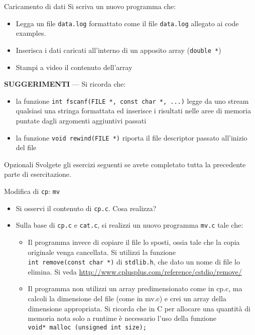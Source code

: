 \documentclass{beamer}
\begin{document}
\begin{frame}[fragile]{Caricamento di dati}
Si scriva un nuovo programma che:
\begin{itemize}
 \item Legga un file \texttt{data.log} formattato come il file \texttt{data.log} allegato ai code examples.
 \item Inserisca i dati caricati all'interno di un apposito array (\texttt{double *})
 \item Stampi a video il contenuto dell'array
\end{itemize}
\scriptsize
\textbf{SUGGERIMENTI} --- Si ricorda che:
\begin{itemize}
 \item la funzione \texttt{int fscanf(FILE *, const char *, ...)} legge da uno stream qualsiasi una stringa formattata ed inserisce i risultati nelle aree di memoria puntate dagli argomenti aggiuntivi passati
 \item la funzione \texttt{void rewind(FILE *)} riporta il file descriptor passato all'inizio del file
\end{itemize}
\end{frame}

\begin{frame}[fragile]{Opzionali}
Svolgete gli esercizi seguenti se avete completato tutta la precedente parte di esercitazione.
\end{frame}

\begin{frame}[fragile]{Modifica di \texttt{cp}: \texttt{mv}}
\begin{itemize}
 \item Si osservi il contenuto di \texttt{cp.c}. Cosa realizza?
 \item Sulla base di \texttt{cp.c} e \texttt{cat.c}, si realizzi un nuovo programma \texttt{mv.c} tale che:
 \begin{itemize}
  \item Il programma invece di copiare il file lo sposti, ossia tale che la copia originale venga cancellata. Si utilizzi la funzione \\ \texttt{int remove(const char *)} di \texttt{stdlib.h}, che dato un nome di file lo elimina. Si veda \url{http://www.cplusplus.com/reference/cstdio/remove/}
  \item Il programma non utilizzi un array predimensionato come in cp.c, ma calcoli la dimensione del file (come in mv.c) e crei un array della dimensione appropriata. Si ricorda che in C per allocare una quantità di memoria nota solo a runtime è necessario l'uso della funzione \\ \texttt{void* malloc (unsigned int size);}
 \end{itemize}
\end{itemize}
\end{frame}
\end{document}
